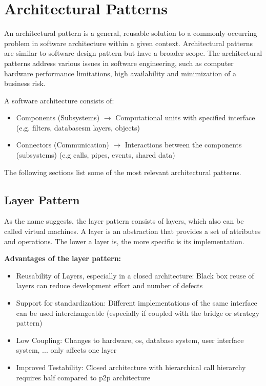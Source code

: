 
\section{Architectural Patterns}
An architectural pattern is a general, reusable solution to a commonly occurring problem in software architecture within a given context.
Architectural patterns are similar to software design pattern but have a broader scope.
The architectural patterns address various issues in software engineering, such as computer hardware performance limitations, high availability and minimization of a business risk.

A software architecture consists of:
\begin{itemize}
	\item Components (Subsystems)
	\subitem $\rightarrow$ Computational units with specified interface (e.g. filters, databasesm layers, objects)
	\item Connectors (Communication)
	\subitem $\rightarrow$ Interactions between the components (subsystems) (e.g calls, pipes, events, shared data)
\end{itemize}

The following sections list some of the most relevant architectural patterns.
\newpage

\subsection{Layer Pattern}
As the name suggests, the layer pattern consists of layers, which also can be called virtual machines.
A layer is an abstraction that provides a set of attributes and operations.
The lower a layer is, the more specific is its implementation.\newline

\textbf{Advantages of the layer pattern:}
\begin{itemize}[topsep=5pt, itemsep=0pt]
	\item Reusability of Layers, especially in a closed architecture:
		\subitem Black box reuse of layers can reduce development effort and number of defects
	\item Support for standardization:
		\subitem Different implementations of the same interface can be used interchangeable
		\subitem (especially if coupled with the bridge or strategy pattern)
	\item Low Coupling:
		\subitem Changes to hardware, os, database system, user interface
		system, ... only affects one layer
	\item Improved Testability:
		\subitem Closed architecture with hierarchical call hierarchy requires half
		compared to p2p architecture
\end{itemize}

